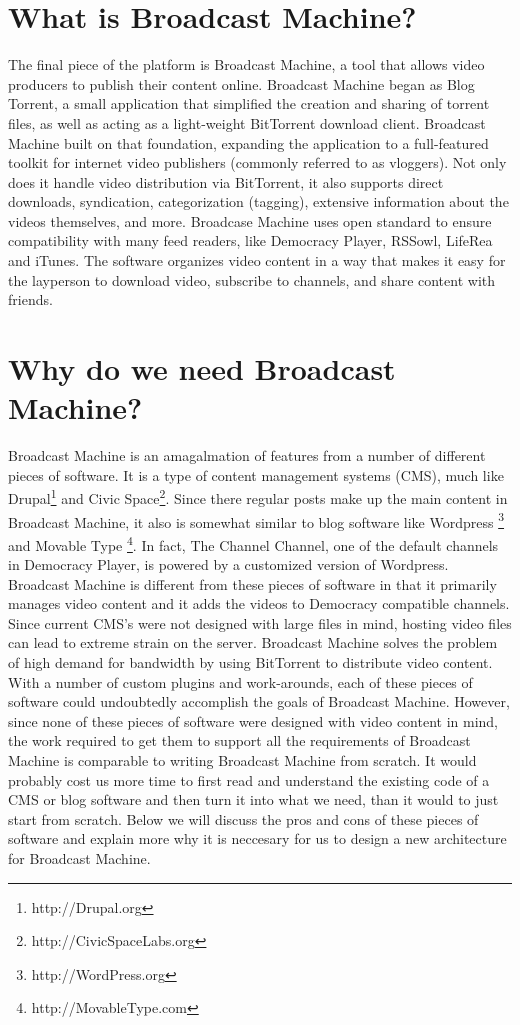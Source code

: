 \documentclass[a4paper,12pt]{report}
\begin{document}
\section{What is Broadcast Machine?}
The final piece of the platform is Broadcast Machine, a tool that allows video producers to publish their content online.
Broadcast Machine began as Blog Torrent, a small application that simplified the creation and sharing of torrent files, as well as acting as a light-weight BitTorrent download client.
Broadcast Machine built on that foundation, expanding the application to a full-featured toolkit for internet video publishers (commonly referred to as vloggers).
Not only does it handle video distribution via BitTorrent, it also supports direct downloads, syndication, categorization (tagging), extensive information about the videos themselves, and more.
Broadcase Machine uses open standard to ensure compatibility with many feed readers, like Democracy Player, RSSowl, LifeRea and iTunes.
The software organizes video content in a way that makes it easy for the layperson to download video, subscribe to channels, and share content with friends.

\section {Why do we need Broadcast Machine?}
Broadcast Machine is an amagalmation of features from a number of different pieces of software.
It is a type of content management systems (CMS), much like Drupal\footnote{http://Drupal.org} and Civic Space\footnote{http://CivicSpaceLabs.org}.
Since there regular posts make up the main content in Broadcast Machine, it also is somewhat similar to blog software like Wordpress \footnote{http://WordPress.org} and Movable Type \footnote{ http://MovableType.com}.
In fact, The Channel Channel, one of the default channels in Democracy Player, is powered by a customized version of Wordpress.
Broadcast Machine is different from these pieces of software in that it primarily manages video content and it adds the videos to Democracy compatible channels.
Since current CMS's were not designed with large files in mind, hosting video files can lead to extreme strain on the server.
Broadcast Machine solves the problem of high demand for bandwidth by using BitTorrent to distribute video content.
With a number of custom plugins and work-arounds, each of these pieces of software could undoubtedly accomplish the goals of Broadcast Machine.
However, since none of these pieces of software were designed with video content in mind, the work required to get them to support all the requirements of Broadcast Machine is comparable to writing Broadcast Machine from scratch. 
It would probably cost us more time to first read and understand the existing code of a CMS or blog software and then turn it into what we need, than it would to just start from scratch. 
Below we will discuss the pros and cons of these pieces of software and explain more why it is neccesary for us to design a new architecture for Broadcast Machine. 
\end{document}
